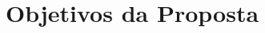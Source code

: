 \documentclass[11pt,oneside,brazil,hidelinks,article,sumario=tradicional,a4paper]{abntex2}
\begin{document}


\section{Objetivos da Proposta}\label{sec:objs}
\end{document}
